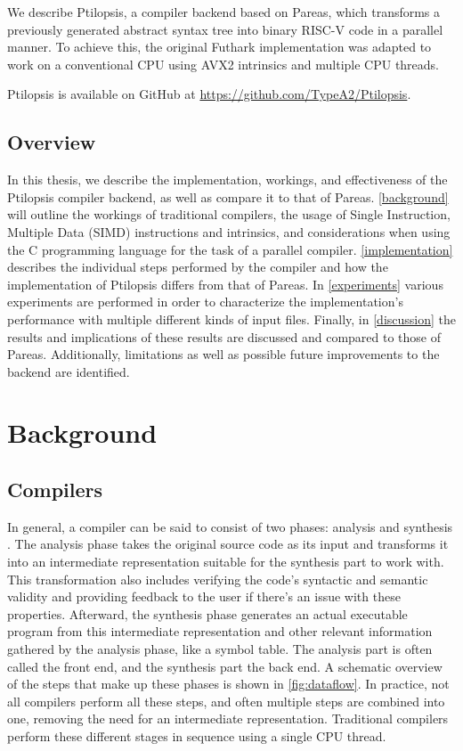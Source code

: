 \documentclass[12pt,dvipsnames]{article}
\newcommand{\Rplus}{\protect\hspace{-.1em}\protect\raisebox{.35ex}{\smaller{\smaller\textbf{+}}}}
\newcommand{\Cpp}{\mbox{C\Rplus\Rplus}\xspace}
\begin{document}
We describe Ptilopsis, a compiler backend based on Pareas, which transforms a previously generated abstract syntax tree into binary RISC-V code in a parallel manner. To achieve this, the original Futhark implementation was adapted to work on a conventional CPU using AVX2 intrinsics \cite{intrinsics} and multiple CPU threads.

Ptilopsis is available on GitHub at \url{https://github.com/TypeA2/Ptilopsis}.

\subsection{Overview}
In this thesis, we describe the implementation, workings, and effectiveness of the Ptilopsis compiler backend, as well as compare it to that of Pareas.
\autoref{background} will outline the workings of traditional compilers, the usage of Single Instruction, Multiple Data (SIMD) instructions and intrinsics, and considerations when using the \Cpp programming language for the task of a parallel compiler.
\autoref{implementation} describes the individual steps performed by the compiler and how the implementation of Ptilopsis differs from that of Pareas.
In \autoref{experiments} various experiments are performed in order to characterize the implementation's performance with multiple different kinds of input files.
Finally, in \autoref{discussion} the results and implications of these results are discussed and compared to those of Pareas. Additionally, limitations as well as possible future improvements to the backend are identified.

\newpage

\section{Background} \label{background}
\subsection{Compilers}
In general, a compiler can be said to consist of two phases: analysis and synthesis \cite{compilerbook}. The analysis phase takes the original source code as its input and transforms it into an intermediate representation suitable for the synthesis part to work with. This transformation also includes verifying the code's syntactic and semantic validity and providing feedback to the user if there's an issue with these properties. Afterward, the synthesis phase generates an actual executable program from this intermediate representation and other relevant information gathered by the analysis phase, like a symbol table. The analysis part is often called the front end, and the synthesis part the back end. A schematic overview of the steps that make up these phases is shown in \autoref{fig:dataflow}. In practice, not all compilers perform all these steps, and often multiple steps are combined into one, removing the need for an intermediate representation. Traditional compilers perform these different stages in sequence using a single CPU thread.
\end{document}
